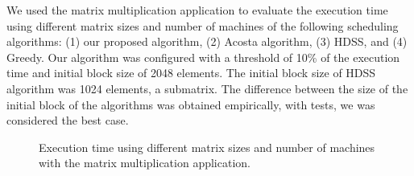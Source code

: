 \documentclass[journal]{IEEEtran}
\begin{document}
We used the matrix multiplication application to evaluate the execution time
using different matrix sizes and number of machines of the following scheduling
algorithms: (1) our proposed algorithm, (2) Acosta algorithm, (3) HDSS, and (4)
Greedy. Our algorithm was configured with a threshold of 10\% of the execution
time and initial block size of 2048 elements. The initial block size of HDSS
algorithm was 1024 elements, a submatrix. The difference between the size of the initial block of the algorithms was obtained empirically, with tests, we was considered the best case.

\begin{figure}[htb]
	\begin{center}
	\centering
	\caption{Execution time using different matrix sizes and number of
          machines with the matrix multiplication application.}
	\label{fig:todosJuntos}
	\end{center}
\end{figure}
\end{document}
